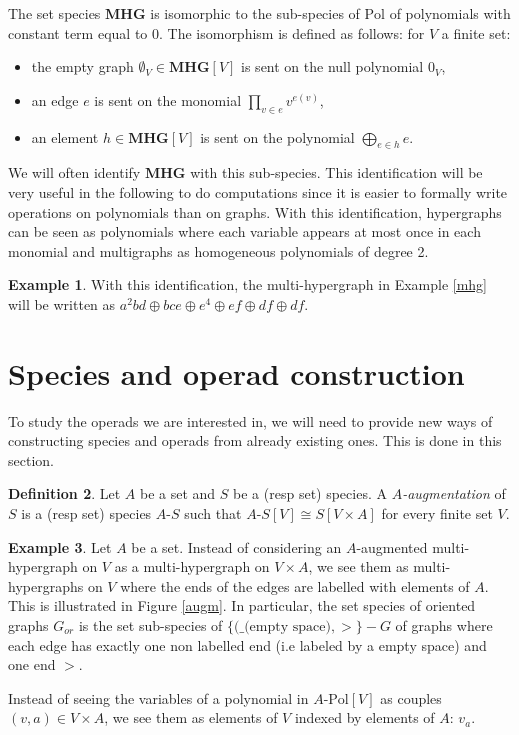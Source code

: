 \documentclass[a4paper]{article}
\theoremstyle{definition}
\newtheorem{definition}{Definition}
\newtheorem{example}[definition]{Example}
\newcommand{\MHG}{\mathbf{MHG}}
\begin{document}
The set species $\MHG$ is isomorphic to the sub-species of $\text{Pol}$ 
of polynomials with constant term equal to 0. The isomorphism is defined 
as follows: for $V$ a finite set:
\begin{itemize}
\item the empty graph $\emptyset_V\in \MHG[V]$ is sent on the null polynomial $0_V$,
\item an edge $e$ is sent on the monomial $\prod_{v\in e} v^{e(v)}$,
\item an element $h\in \MHG[V]$ is sent on the polynomial $\bigoplus_{e\in h} e$.
\end{itemize}

We will often identify $\MHG$ with this sub-species. This identification 
will be very useful in the following to do computations since it is easier 
to formally write operations on polynomials than on graphs. With this 
identification, hypergraphs can be seen as polynomials where each variable 
appears at most once in each monomial and multigraphs as homogeneous polynomials of degree 2.

\begin{example}
With this identification, the multi-hypergraph in Example \ref{mhg} will be 
written as $a^2bd\oplus bce\oplus e^4\oplus ef\oplus df\oplus df$.
\end{example}



\section{Species and operad construction}\label{sec:constructions}
To study the operads we are interested in, we will need to provide new ways 
of constructing species and operads from already existing ones. This is done in this section.

\begin{definition}
Let $A$ be a set and $S$ be a (resp set) species. A \textit{$A$-augmentation} 
of $S$ is a (resp set) species $A\text{-}S$ such that $A\text{-}S[V] \cong S[V\times A]$ for every finite set $V$.
\end{definition}


\begin{example}
Let $A$ be a set. Instead of considering an $A$-augmented multi-hypergraph on 
$V$ as a multi-hypergraph on $V\times A$, we see them as multi-hypergraphs on 
$V$ where the ends of the edges are labelled with elements of $A$. This is 
illustrated in Figure \ref{augm}. In particular, the set species of oriented 
graphs $G_{or}$ is the set sub-species of $\{(\_\text{(empty space)},>\}-G$ 
of graphs where each edge has exactly one non labelled end (i.e labeled by a empty space) and one end $>$.

Instead of seeing the variables of a polynomial in $A\text{-Pol}[V]$ as couples 
$(v,a)\in V\times A$, we see them as elements of $V$ indexed by elements of $A$: $v_a$.
\end{example}
\end{document}
